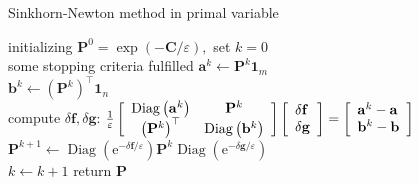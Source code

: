 \documentclass{article}
\begin{document}
\begin{large}
\begin{algorithm}[H]
  \SetAlgoNoLine
  \caption{Sinkhorn-Newton method in primal variable} 
   initializing $\mathbf{P} ^ { 0 } = \exp ( - \mathbf{C} / \varepsilon ) ,$ set $k = 0$\\
  \Repeat
  { some stopping criteria fulfilled }{
 $\mathbf{a} ^ { k } \gets \mathbf{P} ^ { k } \mathbf{1}_ { m }$\\  
 $\mathbf{b} ^ { k } \gets \left( \mathbf{P} ^ { k } \right) ^ { \top } \mathbf { 1 } _ { n }$\\
  compute $\delta \mathbf{f}, \delta \mathbf{g}$: 
  \quad$\frac { 1 } { \varepsilon } \left[ \begin{array} { c c } { \operatorname { Diag } \left( \mathbf{a} ^ { k } \right) } & { \mathbf{P} ^ { k } } \\ { \left( \mathbf{P} ^ { k } \right) ^ { \top } } & { \operatorname { Diag } \left( \mathbf{b} ^ { k } \right) } \end{array} \right] \left[ \begin{array} { l } { \delta \mathbf{f} } \\ { \delta \mathbf{g} } \end{array} \right] = \left[ \begin{array} { l } { \mathbf{a} ^ { k } - \mathbf{a} } \\ { \mathbf{b} ^ { k } - \mathbf{b} } \end{array} \right]$\\
$\mathbf{P} ^ { k + 1 } \gets \operatorname { Diag } \left( \mathrm { e } ^ { - \delta \mathbf{f} / \varepsilon } \right) \mathbf{P} ^ { k } \operatorname { Diag } \left( \mathrm { e } ^ { - \delta \mathbf{g} / \varepsilon } \right)$\\
   $k\gets k+1$
  }
  return $\mathbf{P}$
\end{algorithm}


\end{large}
\end{document}
